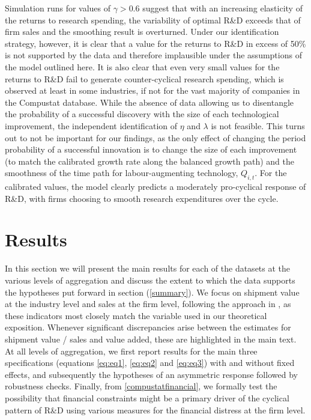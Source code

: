 \documentclass{_latex/house}
\begin{document}
Simulation runs for values of $\gamma>0.6$ suggest that with an increasing elasticity of the returns to research spending, the variability of optimal R\&D exceeds that of firm sales and the smoothing result is overturned. Under our identification strategy, however, it is clear that a value for the returns to R\&D in excess of 50\% is not supported by the data and therefore implausible under the assumptions of the model outlined here. It is also clear that even very small values for the returns to R\&D fail to generate counter-cyclical research spending, which is observed at least in some industries, if not for the vast majority of companies in the Compustat database. While the absence of data allowing us to disentangle the probability of a successful discovery with the size of each technological improvement, the independent identification of $\eta$ and $\lambda$ is not feasible. This turns out to not be important for our findings, as the only effect of changing the period probability of a successful innovation is to change the size of each improvement (to match the calibrated growth rate along the balanced growth path) and the smoothness of the time path for labour-augmenting technology, $Q_{i,t}$. For the calibrated values, the model clearly predicts a moderately pro-cyclical response of R\&D, with firms choosing to smooth research expenditures over the cycle.

\section{Results} \label{results}

In this section we will present the main results for each of the datasets at the various levels of aggregation and discuss the extent to which the data supports the hypotheses put forward in section (\ref{summary}). We focus on shipment value at the industry level and sales at the firm level, following the approach in \cite{RePEc:tpr:restat:v:93:y:2011:i:2:p:542-553}, as these indicators most closely match the variable used in our theoretical exposition. Whenever significant discrepancies arise between the estimates for shipment value / sales and value added, these are highlighted in the main text. At all levels of aggregation, we first report results for the main three specifications (equations \ref{eq:eq1}, \ref{eq:eq2} and \ref{eq:eq3}) with and without fixed effects, and subsequently the hypotheses of an asymmetric response followed by robustness checks. Finally, from \ref{compustatfinancial}, we formally test the possibility that financial constraints might be a primary driver of the cyclical pattern of R\&D using various measures for the financial distress at the firm level.
\end{document}
